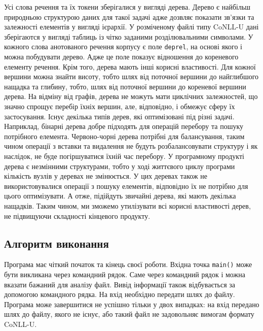Усі слова речення та їх токени зберігалися у вигляді дерева. Дерево є найбільш
природньою структурою даних для такої задачі адже дозвляє показати зв'язки
та залежності елементів у вигляді ієрархії. У розміченому файлі типу CoNLL-U дані зберігаются
у вигляді таблиць із чітко заданими розділювальними символами.
У кожного слова анотованого речення корпусу є поле \texttt{deprel},
на основі якого і можна побудувати дерево. Адже це поле показує відношення до кореневого
елементу речення. Крім того, дерева мають інші корисні властивості. Для кожної вершини
можна знайти висоту, тобто шлях від поточної вершини до найглибшого нащадка та глибину,
тобто, шлях від поточної вершини до кореневої вершини дерева.
На відміну від графів, дерева не можуть мати циклічних залежностей, що
значно спрощує перебір їхніх вершин, але, відповідно, і обмежує сферу їх застосування.
Існує декілька типів дерев, які оптимізовані під різні задачі. Наприклад, бінарні
дерева добре підходять для операцій перебору та пошуку потрібного елемента.
Червоно-чорні дерева потрібні для балансування, таким чином операції з вставки та
видалення не будуть розбалансовувати структуру і як наслідок, не буде погіршуватися
їхній час перебору. У програмному продукті дерева є незмінними структурами, тобто
у ході життєвого циклу програми кількість вузлів у деревах не змінюється. У цих деревах
також не використовувалися операції з пошуку елементів, відповідно їх не потрібно
для цього оптимізувати. А отже, підійдуть звичайні дерева, які мають декілька
нащадків. Таким чином, ми зможемо утилізувати всі корисні властивості дерев,
не підвищуючи складності кінцевого продукту.

\subsection{Алгоритм виконання}
Програма має чіткий початок та кінець своєї роботи. Вхідна точка \texttt{main()} може
бути викликана через командний рядок. Саме через командний рядок і можна вказати бажаний
для аналізу файл. Вивід інформації також відбувається за допомогою командного
рядка. На вхід необхідно передати шлях до файлу. Програма може завершитися не успішно
тільки у двох випадках: на вхід передано шлях до файлу, якого не існує, або такий
файл не задовольняє вимогам формату CoNLL-U.

